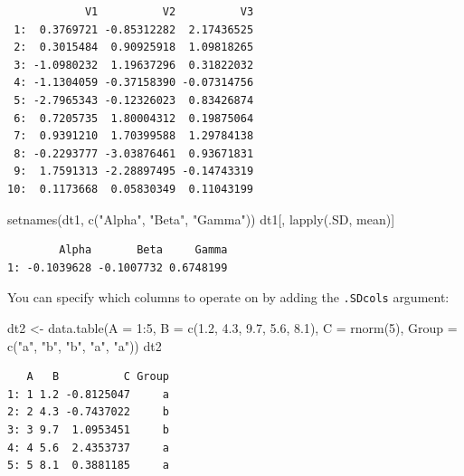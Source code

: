 \documentclass[
]{book}
\newenvironment{Shaded}{\begin{snugshade}}{\end{snugshade}}
\newcommand{\AttributeTok}[1]{\textcolor[rgb]{0.77,0.63,0.00}{#1}}
\newcommand{\DecValTok}[1]{\textcolor[rgb]{0.00,0.00,0.81}{#1}}
\newcommand{\FloatTok}[1]{\textcolor[rgb]{0.00,0.00,0.81}{#1}}
\newcommand{\FunctionTok}[1]{\textcolor[rgb]{0.00,0.00,0.00}{#1}}
\newcommand{\NormalTok}[1]{#1}
\newcommand{\OtherTok}[1]{\textcolor[rgb]{0.56,0.35,0.01}{#1}}
\newcommand{\SpecialCharTok}[1]{\textcolor[rgb]{0.00,0.00,0.00}{#1}}
\newcommand{\StringTok}[1]{\textcolor[rgb]{0.31,0.60,0.02}{#1}}
\begin{document}
\begin{verbatim}
            V1          V2          V3
 1:  0.3769721 -0.85312282  2.17436525
 2:  0.3015484  0.90925918  1.09818265
 3: -1.0980232  1.19637296  0.31822032
 4: -1.1304059 -0.37158390 -0.07314756
 5: -2.7965343 -0.12326023  0.83426874
 6:  0.7205735  1.80004312  0.19875064
 7:  0.9391210  1.70399588  1.29784138
 8: -0.2293777 -3.03876461  0.93671831
 9:  1.7591313 -2.28897495 -0.14743319
10:  0.1173668  0.05830349  0.11043199
\end{verbatim}

\begin{Shaded}
\begin{Highlighting}[]
\FunctionTok{setnames}\NormalTok{(dt1, }\FunctionTok{c}\NormalTok{(}\StringTok{"Alpha"}\NormalTok{, }\StringTok{"Beta"}\NormalTok{, }\StringTok{"Gamma"}\NormalTok{))}
\NormalTok{dt1[, }\FunctionTok{lapply}\NormalTok{(.SD, mean)]}
\end{Highlighting}
\end{Shaded}

\begin{verbatim}
        Alpha       Beta     Gamma
1: -0.1039628 -0.1007732 0.6748199
\end{verbatim}

You can specify which columns to operate on by adding the \texttt{.SDcols} argument:

\begin{Shaded}
\begin{Highlighting}[]
\NormalTok{dt2 }\OtherTok{\textless{}{-}} \FunctionTok{data.table}\NormalTok{(}\AttributeTok{A =} \DecValTok{1}\SpecialCharTok{:}\DecValTok{5}\NormalTok{,}
                  \AttributeTok{B =} \FunctionTok{c}\NormalTok{(}\FloatTok{1.2}\NormalTok{, }\FloatTok{4.3}\NormalTok{, }\FloatTok{9.7}\NormalTok{, }\FloatTok{5.6}\NormalTok{, }\FloatTok{8.1}\NormalTok{),}
                  \AttributeTok{C =} \FunctionTok{rnorm}\NormalTok{(}\DecValTok{5}\NormalTok{),}
                  \AttributeTok{Group =} \FunctionTok{c}\NormalTok{(}\StringTok{"a"}\NormalTok{, }\StringTok{"b"}\NormalTok{, }\StringTok{"b"}\NormalTok{, }\StringTok{"a"}\NormalTok{, }\StringTok{"a"}\NormalTok{))}
\NormalTok{dt2}
\end{Highlighting}
\end{Shaded}

\begin{verbatim}
   A   B          C Group
1: 1 1.2 -0.8125047     a
2: 2 4.3 -0.7437022     b
3: 3 9.7  1.0953451     b
4: 4 5.6  2.4353737     a
5: 5 8.1  0.3881185     a
\end{verbatim}
\end{document}
